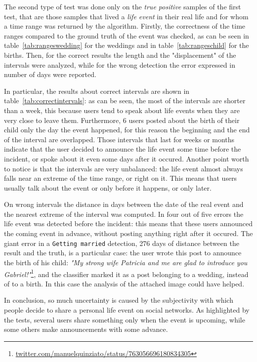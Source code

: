 The second type of test was done only on the \emph{true positive} samples of the first test, that are those samples that lived a \emph{life event} in their real life and for whom a time range was returned by the algorithm. Firstly, the correctness of the time ranges compared to the ground truth of the event was checked, as can be seen in table~\ref{tab:rangeswedding} for the weddings and in table~\ref{tab:rangeschild} for the births. Then, for the correct results the length and the "displacement" of the intervals were analyzed, while for the wrong detection the error expressed in number of days were reported.

In particular, the results about correct intervals are shown in table~\ref{tab:correctintervals}: as can be seen, the most of the intervals are shorter than a week, this because users tend to speak about life events when they are very close to leave them. Furthermore, 6 users posted about the birth of their child only the day the event happened, for this reason the beginning and the end of the interval are overlapped. Those intervals that last for weeks or months indicate that the user decided to announce the life event some time before the incident, or spoke about it even some days after it occured. Another point worth to notice is that the intervals are very unbalanced: the life event almost always falls near an extreme of the time range, or right on it. This means that users usually talk about the event or only before it happens, or only later.

On wrong intervals the distance in days between the date of the real event and the nearest extreme of the interval was computed. In four out of five errors the life event was detected before the incident: this means that these users announced the coming event in advance, without posting anything right after it occured. The giant error in a \texttt{Getting married} detection, 276 days of distance between the result and the truth, is a particular case: the user wrote this post to announce the birth of his child: \textit{"My strong wife Patricia and me are glad to introduce you Gabriel!"}\footnote{\url{twitter.com/manuelquinziato/status/763056696180834305}}, and the classifier marked it as a post belonging to a wedding, instead of to a birth. In this case the analysis of the attached image could have helped.

In conclusion, so much uncertainty is caused by the subjectivity with which people decide to share a personal life event on social networks. As highlighted by the tests, several users share something only when the event is upcoming, while some others make announcements with some advance. 

